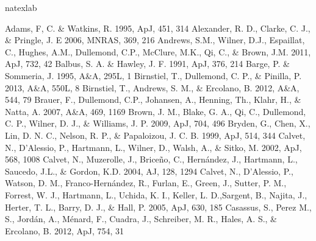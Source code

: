\documentclass[apj]{emulateapj}
\begin{document}
\begin{thebibliography}{}
\expandafter\ifx\csname natexlab\endcsname\relax\def\natexlab#1{#1}\fi

 Adams, F, C. \& Watkins, R. 1995, ApJ, 451, 314
 Alexander, R. D., Clarke, C. J., \& Pringle, J. E 2006, MNRAS, 369, 216
 Andrews, S.M., Wilner, D.J., Espaillat, C., Hughes, A.M., Dullemond, C.P., McClure, M.K., Qi, C., \& Brown, J.M. 2011, ApJ, 732, 42 
 Balbus, S. A. \&  Hawley, J. F. 1991, ApJ, 376, 214
 Barge, P. \&  Sommeria, J. 1995, A\&A, 295L, 1
 Birnstiel, T., Dullemond, C. P., \& Pinilla, P. 2013, A\&A, 550L, 8
 Birnstiel, T., Andrews, S. M., \& Ercolano, B. 2012, A\&A, 544, 79
 Brauer, F., Dullemond, C.P., Johansen, A., Henning, Th., Klahr, H., \& Natta, A. 2007, A\&A, 469, 1169
 Brown, J. M., Blake, G. A., Qi, C., Dullemond, C. P., Wilner, D. J., \& Williams, J. P. 2009, ApJ, 704, 496
 Bryden, G., Chen, X., Lin, D. N. C., Nelson, R. P., \& Papaloizou, J. C. B. 1999, ApJ, 514, 344
 Calvet, N., D'Alessio, P., Hartmann, L., Wilner, D., Walsh, A., \& Sitko, M. 2002, ApJ, 568, 1008
 Calvet, N., Muzerolle, J., Brice\~no, C.,  Hern\'andez, J., Hartmann, L., Saucedo, J.L., \& Gordon, K.D. 2004, AJ, 128, 1294
 Calvet, N., D'Alessio, P., Watson, D. M., Franco-Hern\'andez, R., Furlan, E., Green, J., Sutter, P. M., Forrest, W. J., Hartmann, L., Uchida, K. I., Keller, L. D.,Sargent, B., Najita, J., Herter, T. L., Barry, D. J., \& Hall, P. 2005, ApJ, 630, 185
 Casassus, S., Perez M., S., Jord\'an, A., M\'enard, F., Cuadra, J., Schreiber, M. R., Hales, A. S., \& Ercolano, B. 2012, ApJ, 754, 31

\end{thebibliography}
\end{document}
